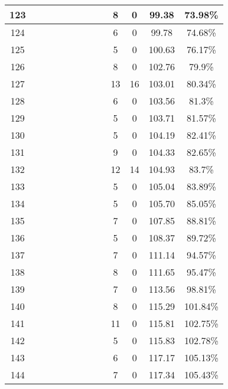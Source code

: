 \begin{longtable}{|c|c|c|c|c|c|c|c|c|c|c|c|c|}
123 &  \x    & \x    &       &       &       &       & \x    &       & 8 & 0 & 99.38 & 73.98\% \\ \hline
124 &  \x    & \x    &       &       & \x    &       & \x    &       & 6 & 0 & 99.78 & 74.68\% \\ \hline
125 &  \x    & \x    & \x    &       &       & \x\m  &       & \x    & 5 & 0 & 100.63 & 76.17\% \\ \hline
126 &  \x    & \x    &       & \x    &       &       &       & \x\m  & 8 & 0 & 102.76 & 79.9\% \\ \hline
127 &  \x    & \x    &       & \x    & \x\m  &       & \x\m  &       & 13 & 16 & 103.01 & 80.34\% \\ \hline
128 &  \x    & \x    &       &       &       & \x    & \x    &       & 6 & 0 & 103.56 & 81.3\% \\ \hline
129 &  \x    & \x    &       &       &       & \x    &       & \x    & 5 & 0 & 103.71 & 81.57\% \\ \hline
130 &  \x    & \x    &       & \x    &       & \x    &       & \x    & 5 & 0 & 104.19 & 82.41\% \\ \hline
131 &  \x    & \x    &       & \x    &       & \x\m  &       &       & 9 & 0 & 104.33 & 82.65\% \\ \hline
132 &  \x    & \x    &       &       & \x\m  &       & \x\m  &       & 12 & 14 & 104.93 & 83.7\% \\ \hline
133 &  \x    & \x    &       & \x    & \x    &       &       & \x    & 5 & 0 & 105.04 & 83.89\% \\ \hline
134 &  \x    & \x    & \x    &       &       & \x\m  & \x\m  &       & 5 & 0 & 105.70 & 85.05\% \\ \hline
135 &  \x    & \x    &       &       &       & \x\m  &       & \x\m  & 7 & 0 & 107.85 & 88.81\% \\ \hline
136 &  \x    & \x    &       & \x    & \x    &       & \x    &       & 5 & 0 & 108.37 & 89.72\% \\ \hline
137 &  \x    & \x    &       & \x    &       &       & \x    &       & 7 & 0 & 111.14 & 94.57\% \\ \hline
138 &  \x    & \x    &       & \x    &       &       & \x\m  &       & 8 & 0 & 111.65 & 95.47\% \\ \hline
139 &  \x    & \x    &       & \x    &       & \x\m  & \x\m  &       & 7 & 0 & 113.56 & 98.81\% \\ \hline
140 &  \x    & \x    &       & \x    &       &       &       & \x    & 8 & 0 & 115.29 & 101.84\% \\ \hline
141 &  \x    & \x    &       &       &       &       & \x\m  &       & 11 & 0 & 115.81 & 102.75\% \\ \hline
142 &  \x    & \x    &       & \x    &       & \x\m  &       & \x\m  & 5 & 0 & 115.83 & 102.78\% \\ \hline
143 &  \x    & \x    &       & \x    &       & \x    & \x    &       & 6 & 0 & 117.17 & 105.13\% \\ \hline
144 &  \x    & \x    &       &       &       & \x\m  & \x\m  &       & 7 & 0 & 117.34 & 105.43\% \\ \hline
\end{longtable}
\normalsize

